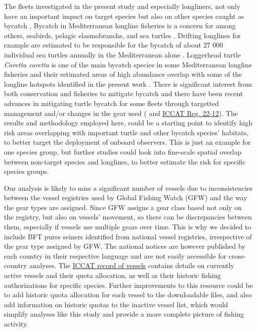\medskip

The fleets investigated in the present study and especially longliners, not only have an important
impact on target species but also on other species caught as bycatch \citep{bycatch_book}, Bycatch
in Mediterranean longline fisheries is a concern for among others, seabirds, pelagic elasmobranchs,
and sea turtles \citep{spain_swo_gear,shark_bycatch,baez_turtles_bycatch}. Drifting longlines for
example are estimated to be responsible for the bycatch of about 27 000 individual sea turtles
annually in the Mediterranean alone \citep{bycatch_book}. Loggerhead turtle \textit{Caretta
	caretta} is one of the main bycatch species in some Mediterranean longline fisheries
\citep{baez_turtles_spain,bycatch_malta} and their estimated areas of high abundance overlap with
some of the longline hotspots identified in the present work \citep{dimatteo_turtles}. There is
significant interest from both conservation and fisheries to mitigate bycatch
\citep{bycatch_humans} and there have been recent advances in mitigating turtle bycatch for some
fleets through targetted management and/or changes in the gear used (\citealp{baez_turtles_spain}
and \href{https://www.iccat.int/Documents/Recs/compendiopdf-e/2022-12-e.pdf}{ICCAT Reg. 22-12}).
The results and methodology employed here, could be a starting point to identify high risk areas
overlapping with important turtle and other bycatch species' habitats, to better target the
deployment of onboard observers. This is just an example for one species group, but further studies
could look into fine-scale spatial overlap between non-target species and longlines, to better
estimate the risk for specific species groups.

\medskip

Our analysis is likely to miss a significant number of vessels due to inconsistencies between the
vessel registries used by Global Fishing Watch (GFW) and the way the gear types are assigned. Since
GFW assigns a gear class based not only on the registry, but also on vessels' movement, so there
can be discrepancies between them, especially if vessels use multiple gears over time. This is why
we decided to include BFT purse seiners identified from national vessel registries, irrespective of
the gear type assigned by GFW\@. The national notices are however published by each country in
their respective language and are not easily accessible for cross-country analyses. The
\href{https://www.iccat.int/en/VesselsRecord.asp}{ICCAT record of vessels} contains details on
currently active vessels and their quota allocation, as well as their historic fishing
authorizations for specific species. Further improvements to this resource could be to add historic
quota allocation for each vessel to the downloadable files, and also add information on historic
quotas to the inactive vessel list, which would simplify analyses like this study and provide a
more complete picture of fishing activity.

